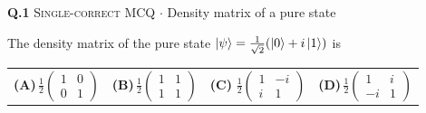 \documentclass[11pt,a4paper]{article}
\newcommand{\optlabel}[1]{\textbf{(#1)}}
\newcommand{\correctlabel}[1]{\textcolor{okgreen}{\textbf{(#1)}\,\ding{51}}}
\newenvironment{qitem}[1]{\begin{list}{}{\setlength{\leftmargin}{3.3em}\setlength{\labelwidth}{3.1em}%
  \setlength{\labelsep}{0.2em}\setlength{\topsep}{3pt}\setlength{\parsep}{3pt}}\item[\textbf{Q.#1}\hfill]}{\end{list}}
\newcommand{\qmeta}[2]{{\footnotesize\color{black!60}\textsc{#1} \;$\cdot$\; #2}\par}
\begin{document}
\begin{qitem}{1}
\qmeta{Single-correct MCQ}{Density matrix of a pure state}
The density matrix of the pure state $\ket\psi = \frac{1}{\sqrt2}(\ket0 + i\ket1)$ is
\par\smallskip\noindent\begin{tabularx}{\linewidth}{@{}*{4}{L}@{}}
\optlabel{A}\,$\frac12\begin{pmatrix}1 & 0\\ 0 & 1\end{pmatrix}$ & \optlabel{B}\,$\frac12\begin{pmatrix}1 & 1\\ 1 & 1\end{pmatrix}$ & \correctlabel{C}\,$\frac12\begin{pmatrix}1 & -i\\ i & 1\end{pmatrix}$ & \optlabel{D}\,$\frac12\begin{pmatrix}1 & i\\ -i & 1\end{pmatrix}$
\end{tabularx}
\end{qitem}
\end{document}
